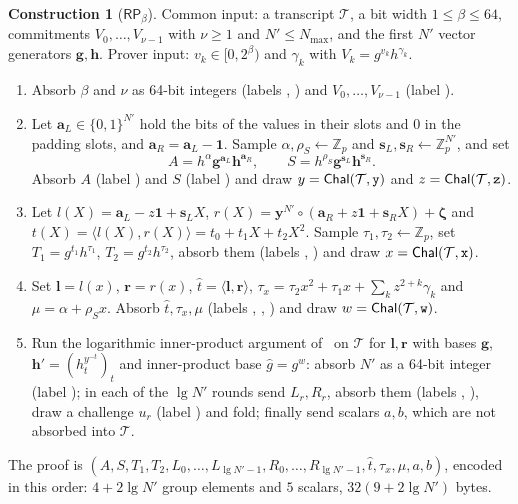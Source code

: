 \documentclass[11pt]{article}
\theoremstyle{definition}
\newtheorem{construction}[lemma]{Construction}
\theoremstyle{remark}
\newcommand{\Z}{\mathbb{Z}}
\newcommand{\RP}{\mathsf{RP}}
\newcommand{\bv}{\mathbf}
\newcommand{\one}{\mathbf 1}
\newcommand{\tr}{\mathcal{T}}
\newcommand{\lbl}[1]{\text{\texttt{#1}}}
\begin{document}
\begin{construction}[$\RP_\beta$]\label{con:rp}
Common input: a transcript $\tr$, a bit width $1\le\beta\le64$, commitments $V_0,\ldots,V_{\nu-1}$ with $\nu\ge1$ and $N'\le N_{\max}$, and the first $N'$ vector generators $\bv g,\bv h$. Prover input: $v_k\in[0,2^\beta)$ and $\gamma_k$ with $V_k=g^{v_k}h^{\gamma_k}$.
\begin{enumerate}[label=\arabic*.]
  \item Absorb $\beta$ and $\nu$ as 64-bit integers (labels , ) and $V_0,\ldots,V_{\nu-1}$ (label ).
  \item Let $\bv a_L\in\{0,1\}^{N'}$ hold the bits of the values in their slots and $0$ in the padding slots, and $\bv a_R=\bv a_L-\one$. Sample $\alpha,\rho_S\gets\Z_p$ and $\bv s_L,\bv s_R\gets\Z_p^{N'}$, and set
  \[
    A=h^\alpha\bv g^{\bv a_L}\bv h^{\bv a_R},\qquad S=h^{\rho_S}\bv g^{\bv s_L}\bv h^{\bv s_R}.
  \]
  Absorb $A$ (label ) and $S$ (label ) and draw $y=\mathsf{Chal}(\tr,\lbl{y})$ and $z=\mathsf{Chal}(\tr,\lbl{z})$.
  \item Let $l(X)=\bv a_L-z\one+\bv s_LX$, $r(X)=\bv y^{N'}\circ(\bv a_R+z\one+\bv s_RX)+\boldsymbol\zeta$ and $t(X)=\langle l(X),r(X)\rangle=t_0+t_1X+t_2X^2$. Sample $\tau_1,\tau_2\gets\Z_p$, set $T_1=g^{t_1}h^{\tau_1}$, $T_2=g^{t_2}h^{\tau_2}$, absorb them (labels , ) and draw $x=\mathsf{Chal}(\tr,\lbl{x})$.
  \item Set $\bv l=l(x)$, $\bv r=r(x)$, $\hat t=\langle\bv l,\bv r\rangle$, $\tau_x=\tau_2x^2+\tau_1x+\sum_kz^{2+k}\gamma_k$ and $\mu=\alpha+\rho_Sx$. Absorb $\hat t,\tau_x,\mu$ (labels , , ) and draw $w=\mathsf{Chal}(\tr,\lbl{w})$.
  \item Run the logarithmic inner-product argument of~\cite[Section~3]{bulletproofs} on $\tr$ for $\bv l,\bv r$ with bases $\bv g$, $\bv h'=(h_t^{y^{-t}})_t$ and inner-product base $\hat g=g^w$: absorb $N'$ as a 64-bit integer (label ); in each of the $\lg N'$ rounds send $L_r,R_r$, absorb them (labels , ), draw a challenge $u_r$ (label ) and fold; finally send scalars $a,b$, which are not absorbed into $\tr$.
\end{enumerate}
The proof is $(A,S,T_1,T_2,L_0,\ldots,L_{\lg N'-1},R_0,\ldots,R_{\lg N'-1},\hat t,\tau_x,\mu,a,b)$, encoded in this order: $4+2\lg N'$ group elements and $5$ scalars, $32(9+2\lg N')$ bytes.


\end{construction}
\end{document}

